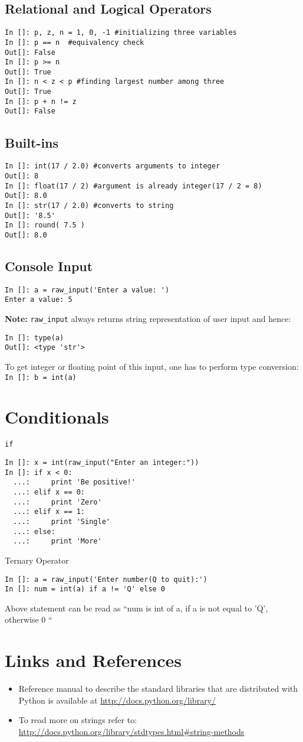 \documentclass[12pt]{article}
\newcommand{\typ}[1]{\lstinline{#1}}
\begin{document}
\subsection{Relational and Logical Operators}
\begin{lstlisting}
In []: p, z, n = 1, 0, -1 #initializing three variables
In []: p == n  #equivalency check
Out[]: False
In []: p >= n 
Out[]: True
In []: n < z < p #finding largest number among three
Out[]: True
In []: p + n != z
Out[]: False
\end{lstlisting}
\subsection{Built-ins}
\begin{lstlisting}
In []: int(17 / 2.0) #converts arguments to integer
Out[]: 8
In []: float(17 / 2) #argument is already integer(17 / 2 = 8)
Out[]: 8.0
In []: str(17 / 2.0) #converts to string
Out[]: '8.5'
In []: round( 7.5 ) 
Out[]: 8.0
\end{lstlisting}
\subsection{Console Input}
\begin{lstlisting}
In []: a = raw_input('Enter a value: ')
Enter a value: 5
\end{lstlisting}
\textbf{Note:} \typ{raw_input} always returns string representation of user input and hence:
\begin{lstlisting}
In []: type(a)
Out[]: <type 'str'>
\end{lstlisting}
To get integer or floating point of this input, one has to perform type conversion:\\
\typ{In []: b = int(a)}
\section{Conditionals}
\typ{if}
\begin{lstlisting}
In []: x = int(raw_input("Enter an integer:"))
In []: if x < 0:
  ...:     print 'Be positive!'
  ...: elif x == 0:
  ...:     print 'Zero'
  ...: elif x == 1:
  ...:     print 'Single'
  ...: else:
  ...:     print 'More'
\end{lstlisting}
Ternary Operator
\begin{lstlisting}
In []: a = raw_input('Enter number(Q to quit):')
In []: num = int(a) if a != 'Q' else 0
\end{lstlisting}
Above statement can be read as ``num is int of a, if a is not equal to 'Q', otherwise 0 ``
\section{Links and References}
\begin{itemize}
  \item Reference manual to describe the standard libraries  that are distributed with Python is available at \url{http://docs.python.org/library/} 
  \item To read more on strings refer to: \\ \url{http://docs.python.org/library/stdtypes.html#string-methods}
\end{itemize}
\end{document}
